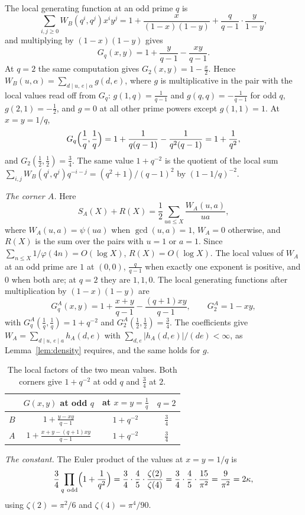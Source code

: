 \documentclass[aps,prd,twocolumn,superscriptaddress,nofootinbib,longbibliography,floatfix,showkeys,nobalancelastpage,amsmath,amssymb,10pt]{revtex4-2}
\theoremstyle{plain}
\theoremstyle{definition}
\theoremstyle{plain}
\begin{document}
The local generating function at an odd prime $q$ is
\[
\sum_{i,j\ge0}W_B(q^i,q^j)x^iy^j=1+\frac x{(1-x)(1-y)}+\frac q{q-1}\cdot\frac y{1-y},
\]
and multiplying by $(1-x)(1-y)$ gives
\[
G_q(x,y)=1+\frac{y}{q-1}-\frac{xy}{q-1}.
\]
At $q=2$ the same computation gives $G_2(x,y)=1-\frac x2$. Hence $W_B(u,\alpha)=\sum_{d\mid u,\,e\mid\alpha}g(d,e)$, where $g$ is multiplicative in the pair with the local values read off from $G_q$: $g(1,q)=\frac1{q-1}$ and $g(q,q)=-\frac1{q-1}$ for odd $q$, $g(2,1)=-\frac12$, and $g=0$ at all other prime powers except $g(1,1)=1$. At $x=y=1/q$,
\[
G_q\Bigl(\frac1q,\frac1q\Bigr)=1+\frac{1}{q(q-1)}-\frac{1}{q^2(q-1)}=1+\frac1{q^2},
\]
and $G_2(\frac12,\frac12)=\frac34$. The same value $1+q^{-2}$ is the quotient of the local sum $\sum_{i,j}W_B(q^i,q^j)q^{-i-j}=(q^2+1)/(q-1)^2$ by $(1-1/q)^{-2}$.

\emph{The corner $A$.} Here
\[
S_A(X)+R(X)=\frac12\sum_{ua\le X}\frac{W_A(u,a)}{ua},
\]
where $W_A(u,a)=\psi(ua)$ when $\gcd(u,a)=1$, $W_A=0$ otherwise, and $R(X)$ is the sum over the pairs with $u=1$ or $a=1$. Since $\sum_{n\le X}1/\varphi(4n)=O(\log X)$, $R(X)=O(\log X)$. The local values of $W_A$ at an odd prime are $1$ at $(0,0)$, $\frac q{q-1}$ when exactly one exponent is positive, and $0$ when both are; at $q=2$ they are $1,1,0$. The local generating functions after multiplication by $(1-x)(1-y)$ are
\[
G^A_q(x,y)=1+\frac{x+y}{q-1}-\frac{(q+1)xy}{q-1},\qquad G^A_2=1-xy,
\]
with $G^A_q(\frac1q,\frac1q)=1+q^{-2}$ and $G^A_2(\frac12,\frac12)=\frac34$. The coefficients give $W_A=\sum_{d\mid u,\,e\mid a}h_A(d,e)$ with $\sum_{d,e}|h_A(d,e)|/(de)<\infty$, as Lemma~\ref{lem:density} requires, and the same holds for $g$.

\begin{table}[h]
\caption{The local factors of the two mean values. Both corners give $1+q^{-2}$ at odd $q$ and $\frac34$ at $2$.}
\label{tab:local}
\centering
\begin{tabular}{@{}lccc@{}}
\toprule
& $G(x,y)$ at odd $q$ & at $x=y=\frac1q$ & $q=2$\\
\midrule
$B$ & $1+\frac{y-xy}{q-1}$ & $1+q^{-2}$ & $\frac34$\\
$A$ & $1+\frac{x+y-(q+1)xy}{q-1}$ & $1+q^{-2}$ & $\frac34$\\
\bottomrule
\end{tabular}
\end{table}

\emph{The constant.} The Euler product of the values at $x=y=1/q$ is
\[
\frac34\prod_{q\ \mathrm{odd}}\Bigl(1+\frac1{q^2}\Bigr)=\frac34\cdot\frac45\cdot\frac{\zeta(2)}{\zeta(4)}=\frac34\cdot\frac45\cdot\frac{15}{\pi^2}=\frac9{\pi^2}=2\kappa,
\]
using $\zeta(2)=\pi^2/6$ and $\zeta(4)=\pi^4/90$.
\end{document}

